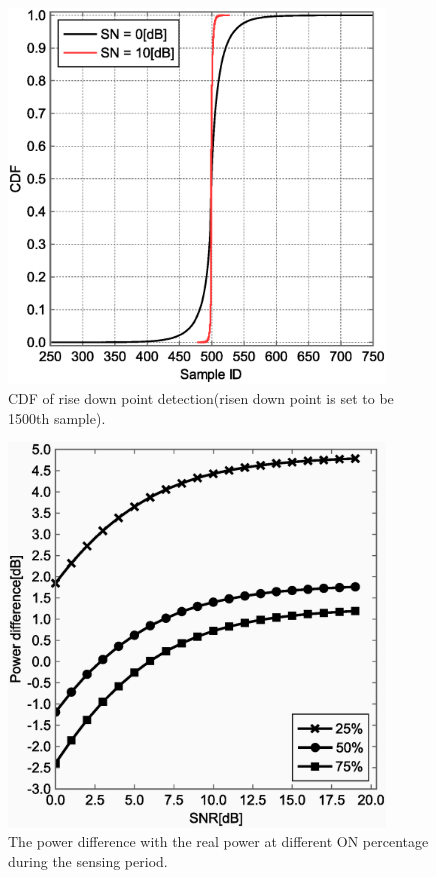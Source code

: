 \begin{figure}[t]
\centering
\includegraphics[width=100mm]{cdf_ON2OFF.eps}
\caption{CDF of rise down point detection(risen down point is set to be 1500th sample).}
\label{cdf_on2off}
\end{figure}


\begin{figure}[t]
\centering
\includegraphics[width=100mm]{per.eps}
\caption{The power difference with the real power at different ON percentage during the sensing period.}
\label{per}
\end{figure}
